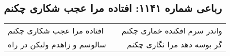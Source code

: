 \begin{center}
\section*{رباعی شماره ۱۱۴۱: افتاده مرا عجب شکاری چکنم}
\label{sec:1141}
\begin{longtable}{l p{0.5cm} r}
افتاده مرا عجب شکاری چکنم
&&
واندر سرم افکنده خماری چکنم
\\
سالوسم و زاهدم ولیکن در راه
&&
گر بوسه دهد مرا نگاری چکنم
\\
\end{longtable}
\end{center}
